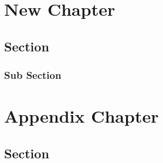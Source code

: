 \documentclass[12pt,oneside]{book}
\begin{document}
\chapter{New Chapter}

\section{Section}
\subsection{Sub Section}


\appendix

\chapter{Appendix Chapter}

\section{Section}
\end{document}
